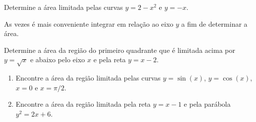 \begin{frame}

\begin{exe} 

 Determine a área limitada pelas curvas $y=2-x^2$ e $y=-x$.


\end{exe}
%
%
%
As vezes é mais conveniente integrar em relação ao eixo $y$ a fim de determinar a área.

\begin{exe}
Determine a área da região do primeiro quadrante que é limitada acima por $y=\sqrt{x}$ e abaixo pelo eixo $x$ e pela reta $y=x-2$.
\end{exe}
%

\end{frame}



\begin{frame}
	\begin{casa}
\begin{enumerate}
	\item Encontre a área da região limitada pelas curvas $y=\sin(x)$, $y=\cos(x)$, $x=0$ e $x=\pi/2$.
	
	\item Encontre a área da região limitada pela reta $y=x-1$ e pela parábola $y^2=2x+6$.
\end{enumerate}
	\end{casa}
\end{frame}

%
%
%
%
%

